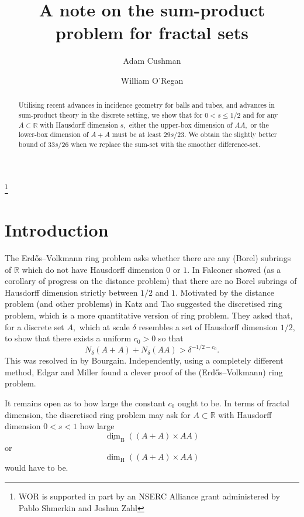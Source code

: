 \documentclass[12pt]{amsart}
\newcommand{\R}{\mathbb{R}}\newcommand{\C}{\mathbb{C}}
\newcommand{\lbox}{\underline\dim_{\mathrm{B}}}
\newcommand{\1}{\mathbf{1}}
\newcommand{\de}{\delta}
\newcommand{\dimh}{\dim_\mathrm{H}}
\newcommand{\cn}[1]{N_\de({#1})}
\begin{document}
	\title{A note on the sum-product problem for fractal sets}
	\author{Adam Cushman}
    \author{William O'Regan}
	
	
	\thanks{WOR is supported in part by an NSERC Alliance grant administered by Pablo Shmerkin and Joshua Zahl}
	\begin{abstract}
		Utilising recent advances in incidence geometry for balls and tubes, and advances in sum-product theory in the discrete setting, we show that for $0 < s \leq 1/2$ and for any $A \subset \R$ with Hausdorff dimension $s,$ either the upper-box dimension of $AA,$ or the lower-box dimension of $A+A$ must be at least $29s/23.$ We obtain the slightly better bound of \(33 s / 26\) when we replace the sum-set with the smoother difference-set. 
	\end{abstract}
	\maketitle

	
	\section{Introduction}
    The Erd\H{o}s--Volkmann ring problem \cite{erd} asks whether there are any (Borel) subrings of $\R$ which do not have Hausdorff dimension $0$ or $1.$ In \cite{falconerdistance} Falconer showed (as a corollary of progress on the distance problem) that there are no Borel subrings of Hausdorff dimension strictly between $1/2$ and $1.$ Motivated by the distance problem (and other problems) in \cite{kat} Katz and Tao suggested the discretised ring problem, which is a more quantitative version of ring problem. They asked that, for a discrete set $A,$ which at scale $\de$ resembles a set of Hausdorff dimension $1/2,$ to show that there exists a uniform $c_0 > 0$ so that 
    $$\cn{A+A} + \cn{AA} > \de^{-1/2-c_0}.$$ This was resolved in \cite{bou03} by Bourgain. Independently, using a completely different method, Edgar and Miller \cite{ed} found a clever proof of the (Erd\H{o}s--Volkmann) ring problem.

    It remains open as to how large the constant $c_0$ ought to be. In terms of fractal dimension, the discretised ring problem may ask for $A \subset \R$ with Hausdorff dimension $0 < s < 1$ how large
    \begin{equation}\label{eq.quantity}
    \lbox((A+A) \times AA) 
    \end{equation}
    or $$\dimh ((A+A) \times AA) $$
    would have to be.
    
\end{document}
